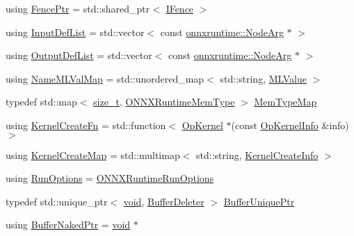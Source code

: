 \begin{DoxyCompactItemize}
\item 
using \mbox{\hyperlink{namespaceonnxruntime_a42d52aa37e4dba8c02178f81eda99eeb}{Fence\+Ptr}} = std\+::shared\+\_\+ptr$<$ \mbox{\hyperlink{classonnxruntime_1_1IFence}{I\+Fence}} $>$
\item 
using \mbox{\hyperlink{namespaceonnxruntime_ab363b0109a9af018fb3e355aac00a360}{Input\+Def\+List}} = std\+::vector$<$ const \mbox{\hyperlink{classonnxruntime_1_1NodeArg}{onnxruntime\+::\+Node\+Arg}} $\ast$ $>$
\item 
using \mbox{\hyperlink{namespaceonnxruntime_a4b3c292f33b95d038b5059f6103f287a}{Output\+Def\+List}} = std\+::vector$<$ const \mbox{\hyperlink{classonnxruntime_1_1NodeArg}{onnxruntime\+::\+Node\+Arg}} $\ast$ $>$
\item 
using \mbox{\hyperlink{namespaceonnxruntime_a48b01f0410ec8d693dbd40d1132bd66c}{Name\+M\+L\+Val\+Map}} = std\+::unordered\+\_\+map$<$ std\+::string, \mbox{\hyperlink{classonnxruntime_1_1MLValue}{M\+L\+Value}} $>$
\item 
typedef std\+::map$<$ \mbox{\hyperlink{mlasi_8h_a503efbc1c6e50825320ad909366b78ab}{size\+\_\+t}}, \mbox{\hyperlink{allocator__info_8h_add3f8ee3ff93395704abae71c30cab18}{O\+N\+N\+X\+Runtime\+Mem\+Type}} $>$ \mbox{\hyperlink{namespaceonnxruntime_ad53d5ace215052258a4346ee68c2624e}{Mem\+Type\+Map}}
\item 
using \mbox{\hyperlink{namespaceonnxruntime_a2e23731e78afbe4e5e15a18493162335}{Kernel\+Create\+Fn}} = std\+::function$<$ \mbox{\hyperlink{classonnxruntime_1_1OpKernel}{Op\+Kernel}} $\ast$(const \mbox{\hyperlink{classonnxruntime_1_1OpKernelInfo}{Op\+Kernel\+Info}} \&info)$>$
\item 
using \mbox{\hyperlink{namespaceonnxruntime_a7f8ff42cd4a103e3be4c6f4227448d28}{Kernel\+Create\+Map}} = std\+::multimap$<$ std\+::string, \mbox{\hyperlink{structonnxruntime_1_1KernelCreateInfo}{Kernel\+Create\+Info}} $>$
\item 
using \mbox{\hyperlink{namespaceonnxruntime_a28ccb3d97f6827bf04d2ce259ff968f1}{Run\+Options}} = \mbox{\hyperlink{structONNXRuntimeRunOptions}{O\+N\+N\+X\+Runtime\+Run\+Options}}
\item 
typedef std\+::unique\+\_\+ptr$<$ \mbox{\hyperlink{mlasi_8h_a88f941d423cb2a819b70a1358982b1a6}{void}}, \mbox{\hyperlink{classonnxruntime_1_1BufferDeleter}{Buffer\+Deleter}} $>$ \mbox{\hyperlink{namespaceonnxruntime_acd830c816d6e0699b671f8ba79bb48f9}{Buffer\+Unique\+Ptr}}
\item 
using \mbox{\hyperlink{namespaceonnxruntime_a1077ff17fe9e6d571cea3082b9e3a22b}{Buffer\+Naked\+Ptr}} = \mbox{\hyperlink{mlasi_8h_a88f941d423cb2a819b70a1358982b1a6}{void}} $\ast$

\end{DoxyCompactItemize}
